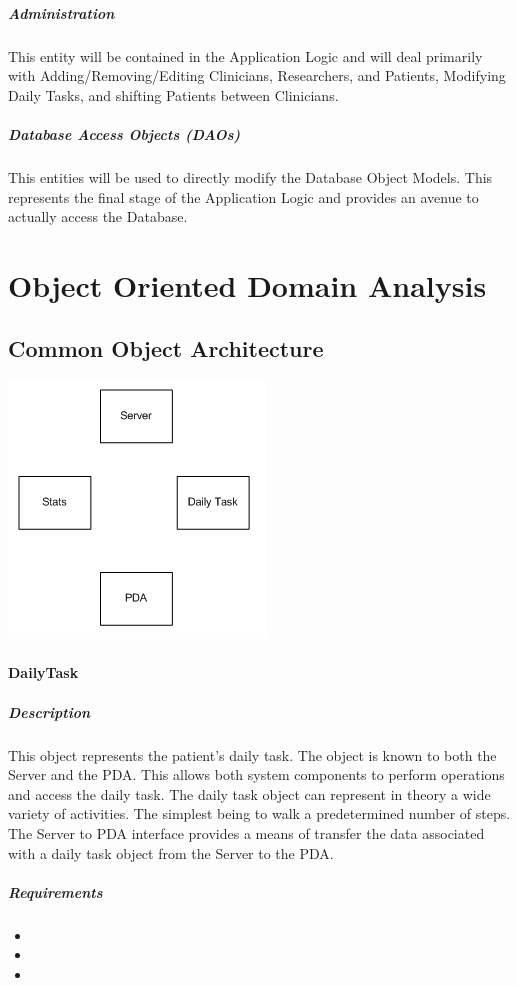\documentclass{article}
\begin{document}
\subparagraph{Administration}
This entity will be contained in the Application Logic and will deal primarily with Adding/Removing/Editing Clinicians, Researchers, and Patients, Modifying Daily Tasks, and shifting Patients between Clinicians.

\subparagraph{Database Access Objects (DAOs)}
This entities will be used to directly modify the Database Object Models. This represents the final stage of the Application Logic and provides an avenue to actually access the Database. 

\newpage

\section{Object Oriented Domain Analysis}

\subsection{Common Object Architecture}\label{sec: common objects}

\begin{center}
\includegraphics{Server3_ooda.png}
\end{center}

\paragraph{DailyTask}
\subparagraph{Description}
This object represents the patient's daily task.  The object is known to both the Server and the PDA.  This allows both system components to perform operations and access the daily task.  The daily task object can represent in theory a wide variety of activities. The simplest being to walk a predetermined number of steps.  The Server to PDA interface provides a means of transfer the data associated with a daily task object from the Server to the PDA. 
\subparagraph{Requirements}
\begin{itemize}
\item {}
\item {}
\item {}
\end{itemize}
\end{document}
